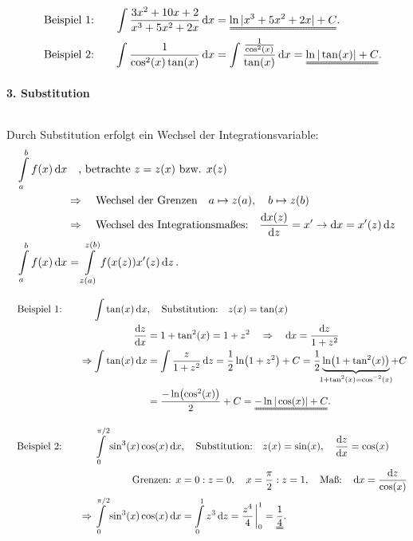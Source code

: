 \begin{alignat}{3}
    &\qq{Beispiel 1:}& \int \frac{3x^2+10x+2}{x^3+5x^2+2x} \dd{x} &= \uuline{\ln|x^3+5x^2+2x| + C}. \\
    &\qq{Beispiel 2:}& \int \frac{1}{\cos^2(x)\tan(x)} \dd{x} &= \int \frac{\frac{1}{\cos^2(x)}}{\tan(x)} \dd{x} = \uuline{\ln|\tan(x)| + C}.
\end{alignat}

\paragraph{3. Substitution}$~$

Durch Substitution erfolgt ein Wechsel der Integrationsvariable: 
\begin{align}
    \int\limits_{a}^{b} f(x) \dd{x} &\qq{, betrachte $z=z(x)$ bzw. $x(z)$} \notag \\
    & \Rightarrow \qq{Wechsel der Grenzen} a \mapsto z(a), \quad b \mapsto z(b) \notag \\
    & \Rightarrow \qq{Wechsel des Integrationsmaßes:} \dv{x(z)}{z} = x' \rightarrow \dd{x} = x'(z) \dd{z} \notag \\
    \int\limits_{a}^{b} f(x) \dd{x} &= \int\limits_{z(a)}^{z(b)} f(x(z)) x'(z) \dd{z}. 
\end{align}

\begin{alignat}{3}
    &\qq{Beispiel 1:}& \int \tan(x) \dd{x} &, \qq{Substitution:} z(x) = \tan(x)\\
    & & \dv{z}{x} &= 1 + \tan^2(x) = 1+z^2 \quad \Rightarrow \quad \dd{x} = \frac{\dd{z}}{1+z^2} \notag \\
    & & \Rightarrow \int \tan(x) \dd{x} &= \int \frac{z}{1+z^2} \dd{z} = \frac{1}{2} \ln(1+z^2) + C = \frac{1}{2} \underbrace{\ln(1+\tan^2(x))}_{\mathclap{1+\tan^2(x) = \cos^{-2}(x)}} + C \notag \\
    & & &= \frac{- \ln(\cos^2(x))}{2} + C = \uuline{-\ln|\cos(x)| + C}.
\end{alignat}

\begin{alignat}{3}
    &\qq{Beispiel 2:}& \int\limits_0^{\pi/2} \sin^3(x)\cos(x) \dd{x} &, \qq{Substitution:} z(x) = \sin(x), \quad \dv{z}{x} = \cos(x) \notag \\
    & & \text{Grenzen: } x&=0: z=0, \quad x = \frac{\pi}{2}: z=1, \qq{Maß:} \dd{x} = \frac{\dd{z}}{\cos(x)} \notag \\
    & & \Rightarrow \int\limits_0^{\pi/2} \sin^3(x)\cos(x) \dd{x} &= \int\limits_{0}^{1} z^3 \dd{z} = \frac{z^4}{4}\eval_0^1 = \uuline{\frac{1}{4}}. 
\end{alignat}

